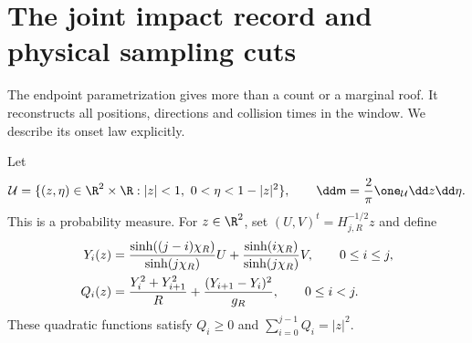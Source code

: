 \section{The joint impact record and physical sampling cuts}
\label{sec:records}
The endpoint parametrization gives more than a count or a marginal roof.
It reconstructs all positions, directions and collision times in the
window. We describe its onset law explicitly.

Let
\begin{equation}\label{eq:paraboloid}
 \mathcal U=\{(z,\eta)\in\R^2\times\R:
                   |z|<1,\ 0<\eta<1-|z|^2\},\qquad
 \dd\mathsf m=\frac2\pi\one_{\mathcal U}\dd z\dd\eta.
\end{equation}
This is a probability measure. For $z\in\R^2$, set
$(U,V)^t=H_{j,R}^{-1/2}z$ and define
\begin{align}\label{eq:limiting-bridge}
 Y_i(z)&=\frac{\sinh((j-i)\chi_R)}{\sinh(j\chi_R)}U
       +\frac{\sinh(i\chi_R)}{\sinh(j\chi_R)}V,\qquad 0\le i\le j,\\
 Q_i(z)&=\frac{Y_i^2+Y_{i+1}^2}{R}
                    +\frac{(Y_{i+1}-Y_i)^2}{g_R},\qquad 0\le i<j.\notag
\end{align}
These quadratic functions satisfy $Q_i\ge0$ and
$\sum_{i=0}^{j-1}Q_i=|z|^2$.

